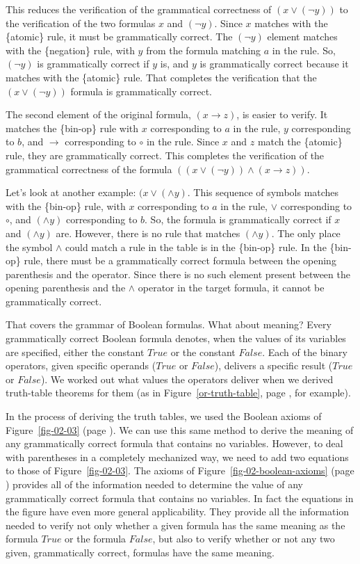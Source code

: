 This reduces the verification of the grammatical correctness of $(x \vee (\neg y))$
to the verification of the two formulas $x$ and $(\neg y)$.
Since $x$ matches with the \{atomic\} rule, it must be grammatically correct.
The $(\neg y)$ element matches with the \{negation\} rule,
with $y$ from the formula matching $a$ in the rule.
So, $(\neg y)$ is grammatically correct if $y$ is,
and $y$ is grammatically correct because it matches with the \{atomic\} rule.
That completes the verification that the $(x \vee (\neg y))$ formula is grammatically correct.

The second element of the original formula,
$(x \rightarrow z)$, is easier to verify.
It matches the \{bin-op\} rule with $x$ corresponding to $a$ in the rule,
$y$ corresponding to $b$, and $\rightarrow$ corresponding to $\circ$ in the rule.
Since $x$ and $z$ match the \{atomic\} rule, they are grammatically correct.
This completes the verification of the grammatical
correctness of the formula $((x \vee (\neg y)) \wedge (x \rightarrow z))$.

Let's look at another example: $(x \vee (\wedge y)$.
This sequence of symbols matches with the \{bin-op\} rule,
with $x$ corresponding to $a$ in the rule,
$\vee$ corresponding to $\circ$,
and $(\wedge y)$ corresponding to $b$.
So, the formula is grammatically correct
if $x$ and $(\wedge y)$ are.
However, there is no rule that matches $(\wedge y)$.
The only place the symbol $\wedge$ could match a rule
in the table is in the \{bin-op\} rule.
In the \{bin-op\} rule, there must be
a grammatically correct formula between
the opening parenthesis and the operator.
Since there is no such element present
between the opening parenthesis
and the $\wedge$ operator in the target formula,
it cannot be grammatically correct.

That covers the grammar of Boolean formulas.
What about meaning?
Every grammatically correct Boolean formula denotes,
when the values of its variables are specified,
either the constant $True$ or the constant $False$.
Each of the binary operators, given specific operands ($True$ or $False$),
delivers a specific result ($True$ or $False$).
We worked out what values the operators deliver
when we derived truth-table theorems for them
(as in Figure~\ref{or-truth-table}, page \pageref{or-truth-table}, for example).

In the process of deriving the truth tables,
we used the Boolean axioms of
Figure~\ref{fig-02-03} (page \pageref{fig-02-03}).
We can use this same method to derive the meaning
of any grammatically correct formula that contains no variables.
However, to deal with parentheses in a completely mechanized way,
we need to add two equations to those of Figure~\ref{fig-02-03}.
The axioms of Figure~\ref{fig-02-boolean-axioms} (page \pageref{fig-02-boolean-axioms})
provides all of the information needed to determine
the value of any grammatically correct formula
that contains no variables.
In fact the equations in the figure have even more general applicability.
They provide all the information needed
to verify not only whether a given formula
has the same meaning as the formula $True$ or the formula $False$,
but also to verify whether or not any two given,
grammatically correct, formulas have the same meaning.

